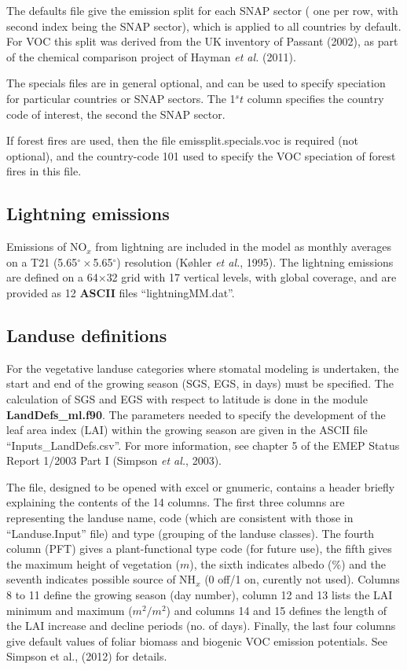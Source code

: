 The defaults file give the emission split for each SNAP sector (
one per row, with second index being the SNAP sector), which
is applied to all countries by default. For VOC this split
was derived from the UK inventory of Passant (2002),
as part of the chemical comparison project of Hayman {\sl et al.} (2011).

The specials files are in general optional, and can be used to specify
speciation for particular countries or SNAP sectors. The
1${^st}$ column specifies the country code of interest, the second the SNAP sector. 

If forest fires are used, then the file emissplit.specials.voc is required
(not optional), and the country-code 101 used to specify the VOC speciation
of forest fires in this file.

\subsection{Lightning emissions}
Emissions of NO$_{x}$ from lightning are included in the model
as monthly averages on a T21 (5.65$^{\circ}\times$5.65$^{\circ}$) resolution (K{\o}hler {\sl et al.}, 1995). 
The lightning emissions are defined on a 64$\times$32 grid with 17 vertical
levels, with global coverage, and are provided as 12 {\bf ASCII} files
``lightningMM.dat''.

\subsection{Landuse definitions}
For the vegetative landuse categories where stomatal modeling is
undertaken, the start and end of the growing season (SGS, EGS, in days) must be specified. 
The calculation of SGS and EGS with respect to latitude is done 
in the module {\bf LandDefs\_ml.f90}. 
The parameters needed to specify the
development of the leaf area index (LAI) within the growing season
are given in the ASCII file ``Inputs\_LandDefs.csv''. 
For more information, see chapter 5  of the EMEP Status Report 1/2003 Part I (Simpson {\sl et al.}, 2003).


The file, designed to be opened with excel or gnumeric,
contains a header briefly explaining the contents of the 
14 columns. 
The first three columns are representing the landuse name, code (which
are consistent with those in ``Landuse.Input'' file) and
type (grouping of the landuse classes). The fourth column 
(PFT) gives a plant-functional type code (for future use),
 the fifth gives
the maximum height of vegetation ($m$), the sixth indicates albedo (\%) and
the seventh indicates possible source of NH$_{x}$ (0 off/1 on,
curently not used). Columns 8 to 11
define the growing season (day number), column 12 and 13 lists the
LAI minimum  and maximum ($m^{2}/m^{2}$) and 
columns 14 and 15
defines the length of the LAI increase and decline periods (no. of days).
Finally, the last four columns give default values of 
foliar biomass and biogenic VOC emission potentials. See Simpson
et al., (2012) for details.


